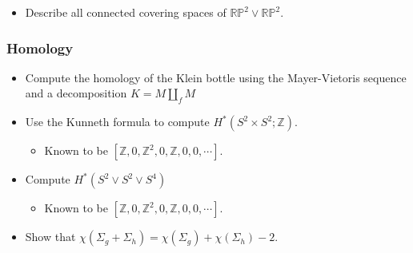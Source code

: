 \begin{itemize}
\tightlist
\item
  Describe all connected covering spaces of
  \({\mathbb{RP}}^2 \vee {\mathbb{RP}}^2\).
\end{itemize}

\hypertarget{homology}{%
\subsubsection{Homology}\label{homology}}

\begin{itemize}
\tightlist
\item
  Compute the homology of the Klein bottle using the Mayer-Vietoris
  sequence and a decomposition \(K = M {\textstyle\coprod}_f M\)
\item
  Use the Kunneth formula to compute
  \(H^*(S^2\times S^2; {\mathbb{Z}})\).

  \begin{itemize}
  \tightlist
  \item
    Known to be
    \([{\mathbb{Z}}, 0, {\mathbb{Z}}^2, 0, {\mathbb{Z}}, 0, 0, \cdots]\).
  \end{itemize}
\item
  Compute \(H^*(S^2 \vee S^2 \vee S^4)\)

  \begin{itemize}
  \tightlist
  \item
    Known to be
    \([{\mathbb{Z}}, 0, {\mathbb{Z}}^2, 0, {\mathbb{Z}}, 0, 0, \cdots]\).
  \end{itemize}
\item
  Show that
  \(\chi(\Sigma_g + \Sigma_h) = \chi(\Sigma_g) + \chi(\Sigma_h) - 2\).
\end{itemize}


\printbibliography[title=Bibliography]



